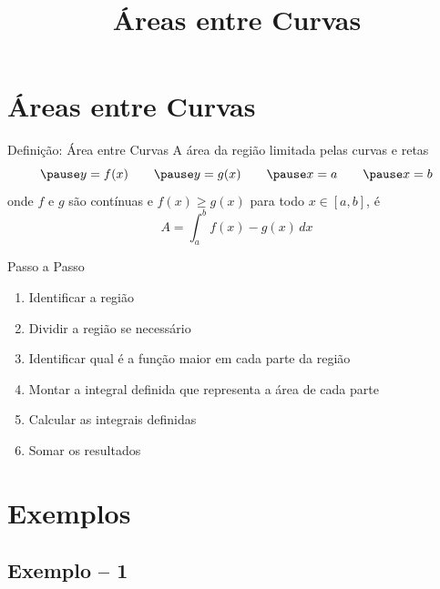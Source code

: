 \documentclass[fleqn,utf8,aspectratio=169,12pt]{beamer}
\title{Áreas entre Curvas}
\begin{document}
\addtitle

\section{Áreas entre Curvas}


\begin{frame}{Definição: Área entre Curvas}
  A área da região limitada pelas curvas e retas
  \[
    \pause
    y = f(x)  \qquad
    \pause
    y = g(x)  \qquad
    \pause
    x = a     \qquad
    \pause
    x = b
  \]
  \pause
  onde $f$ e $g$ são contínuas e
  \pause
  $f(x) \geq g(x)$ para todo $x \in [a, b]$,
  \pause
    é
  \[
    A = \int_a^b f(x) - g(x) \, dx
  \]
\end{frame}

\begin{frame}{Passo a Passo}
  \begin{enumerate}[<+->]
    \item Identificar a região
    \item Dividir a região se necessário
    \item Identificar qual é a função maior em cada parte da região
    \item Montar a integral definida que representa a área de cada parte
    \item Calcular as integrais definidas
    \item Somar os resultados
  \end{enumerate}
\end{frame}

\section{Exemplos}

\subsection{Exemplo -- 1}
\end{document}
